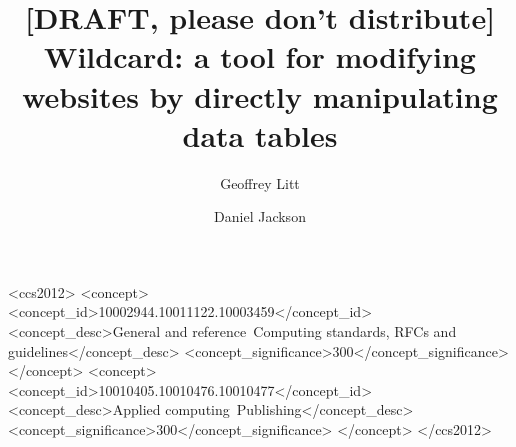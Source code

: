 \documentclass[english,submission]{programming}
\begin{document}
\title{{[}DRAFT, please don't distribute{]} Wildcard: a tool for
modifying websites by directly manipulating data tables}
\subtitle{}%

\author{Geoffrey Litt}
\author{Daniel Jackson}





\begin{CCSXML}
<ccs2012>
<concept>
<concept_id>10002944.10011122.10003459</concept_id>
<concept_desc>General and reference~Computing standards, RFCs and guidelines</concept_desc>
<concept_significance>300</concept_significance>
</concept>
<concept>
<concept_id>10010405.10010476.10010477</concept_id>
<concept_desc>Applied computing~Publishing</concept_desc>
<concept_significance>300</concept_significance>
</concept>
</ccs2012>
\end{CCSXML}



\maketitle
\end{document}
